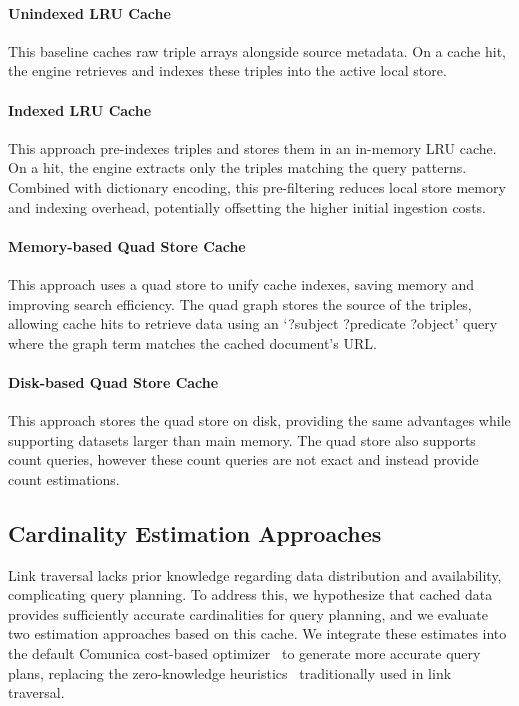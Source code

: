 \paragraph{Unindexed LRU Cache}
This baseline caches raw triple arrays alongside source metadata.
On a cache hit, the engine retrieves and indexes these triples into the active local store.

\paragraph{Indexed LRU Cache}
This approach pre-indexes triples and stores them in an in-memory LRU cache.
On a hit, the engine extracts only the triples matching the query patterns.
Combined with dictionary encoding, this pre-filtering reduces local store memory and indexing overhead,
potentially offsetting the higher initial ingestion costs.

\paragraph{Memory-based Quad Store Cache}
This approach uses a quad store to unify cache indexes, saving memory and improving search efficiency.
The quad graph stores the source of the triples, allowing cache hits to retrieve data using an `?subject ?predicate ?object' query where the graph term matches the cached document's URL.

\paragraph{Disk-based Quad Store Cache}
This approach stores the quad store on disk, providing the same advantages while supporting datasets larger than main memory.
The quad store also supports count queries, however these count queries are not exact and instead provide count estimations.

\subsection{Cardinality Estimation Approaches}

Link traversal lacks prior knowledge regarding data distribution and availability, 
complicating query planning. 
To address this, we hypothesize that cached data provides sufficiently accurate cardinalities for query planning,
and we evaluate two estimation approaches based on this cache.
We integrate these estimates into the default Comunica cost-based optimizer~\cite{taelman2018comunica} 
to generate more accurate query plans, replacing the zero-knowledge heuristics~\cite{hartig2011zero} traditionally used in link traversal.


